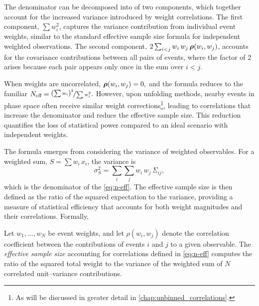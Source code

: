             The denominator can be decomposed into of two components, which together account for the increased variance introduced by weight correlations.
            The first component, \(\sum w_i^2\), captures the variance contribution from individual event weights, similar to the standard effective sample size formula for independent weighted observations.
            The second component, \(2\sum_{i<j} w_i \,w_j\, \vb*{\rho}(w_i, w_j)\), accounts for the covariance contributions between all pairs of events, where the factor of 2 arises because each pair appears only once in the sum over \(i<j\).

            When weights are uncorrelated, \(\vb*{\rho}(w_i, w_j) = 0,\) and the formula reduces to the familiar \(N_{\text{eff}}=\nicefrac{\qty(\sum w_i)^2}{\sum w_i^2}.\)
            However, upon unfolding methods, nearby events in phase space often receive similar weight corrections\footnote{As will be discussed in greater detail in \cref{chap:unbinned_correlations}.}, leading to correlations that increase the denominator and reduce the effective sample size.
            This reduction quantifies the loss of statistical power compared to an ideal scenario with independent weights.

            The formula emerges from considering the variance of weighted observables.
            For a weighted sum, \(S = \sum w_i\,x_i\), the variance is
            \[
                \sigma_S^2 = \sum_i \sum_j w_i\, w_j\, \Sigma_{ij},
            \]
             which is the denominator of the \cref{eq:n-eff}.
             The effective sample size is then defined as the ratio of the squared expectation to the variance, providing a measure of statistical efficiency that accounts for both weight magnitudes and their correlations. Formally,

             \begin{theorem}
                \label{thm:neff-corr}
                Let $w_1,\dots,w_N$ be event weights, and let $\rho(w_i,w_j)$ denote the correlation coefficient between the contributions of events $i$ and $j$ to a given observable. The \emph{effective sample size} accounting for correlations defined in \cref{eq:n-eff} computes the ratio of the squared total weight to the variance of the weighted sum of $N$ correlated unit--variance contributions.
            \end{theorem}

